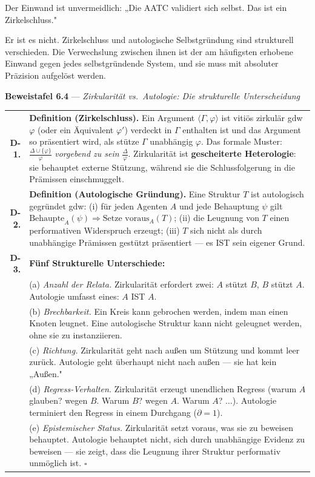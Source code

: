 \documentclass[10pt, openany, oneside]{book}
\renewcommand{\footnotesize}{\fontsize{8.5}{11}\selectfont}
\begin{document}
\vspace{1em}

\noindent Der Einwand ist unvermeidlich: „Die AATC validiert sich selbst. Das ist ein Zirkelschluss."

Er ist es nicht. Zirkelschluss und autologische Selbstgründung sind strukturell verschieden. Die Verwechslung zwischen ihnen ist der am häufigsten erhobene Einwand gegen jedes selbstgründende System, und sie muss mit absoluter Präzision aufgelöst werden.

\textbf{Beweistafel 6.4} --- \textit{Zirkularität vs.\ Autologie: Die strukturelle Unterscheidung}

\vspace{0.5em}

{\footnotesize
\noindent\begin{tabular}{r p{}}
\textbf{D-1.} & \textbf{Definition (Zirkelschluss).} Ein Argument $\langle \Gamma, \varphi \rangle$ ist vitiös zirkulär gdw $\varphi$ (oder ein Äquivalent $\varphi'$) verdeckt in $\Gamma$ enthalten ist und das Argument so präsentiert wird, als stütze $\Gamma$ unabhängig $\varphi$. Das formale Muster: $\frac{\Delta \cup \{\varphi\}}{\varphi}$ \textit{vorgebend zu sein} $\frac{\Delta}{\varphi}$. Zirkularität ist \textbf{gescheiterte Heterologie}: sie behauptet externe Stützung, während sie die Schlussfolgerung in die Prämissen einschmuggelt. \\[0.5em]
\textbf{D-2.} & \textbf{Definition (Autologische Gründung).} Eine Struktur $T$ ist autologisch gegründet gdw: (i) für jeden Agenten $A$ und jede Behauptung $\psi$ gilt $\text{Behaupte}_A(\psi) \Rightarrow \text{Setze voraus}_A(T)$; (ii) die Leugnung von $T$ einen performativen Widerspruch erzeugt; (iii) $T$ sich nicht als durch unabhängige Prämissen gestützt präsentiert --- es IST sein eigener Grund. \\[0.5em]
\textbf{D-3.} & \textbf{Fünf Strukturelle Unterschiede:} \\[0.3em]
& (a) \textit{Anzahl der Relata.} Zirkularität erfordert zwei: $A$ stützt $B$, $B$ stützt $A$. Autologie umfasst eines: $A$ IST $A$. \\[0.2em]
& (b) \textit{Brechbarkeit.} Ein Kreis kann gebrochen werden, indem man einen Knoten leugnet. Eine autologische Struktur kann nicht geleugnet werden, ohne sie zu instanziieren. \\[0.2em]
& (c) \textit{Richtung.} Zirkularität geht nach außen um Stützung und kommt leer zurück. Autologie geht überhaupt nicht nach außen --- sie hat kein „Außen." \\[0.2em]
& (d) \textit{Regress-Verhalten.} Zirkularität erzeugt unendlichen Regress (warum $A$ glauben? wegen $B$. Warum $B$? wegen $A$. Warum $A$? $\ldots$). Autologie terminiert den Regress in einem Durchgang ($\partial = 1$). \\[0.2em]
& (e) \textit{Epistemischer Status.} Zirkularität setzt voraus, was sie zu beweisen behauptet. Autologie behauptet nicht, sich durch unabhängige Evidenz zu beweisen --- sie zeigt, dass die Leugnung ihrer Struktur performativ unmöglich ist. $\square$ \\[0.3em]
\end{tabular}
}
\end{document}
